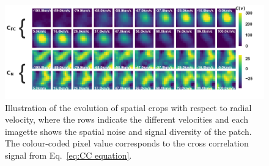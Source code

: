 \documentclass{aa}
\begin{document}
\begin{figure}[t]
    \includegraphics[width=\textwidth]{fig_2_dec2023_aligned_cropped.png}
    \caption{%
    Illustration of the evolution of spatial crops with respect to radial velocity, where the rows indicate the different velocities and each imagette shows the spatial noise and signal diversity of the patch. 
    The colour-coded pixel value corresponds to the cross correlation signal from Eq.~\ref{eq:CC equation}. 
    }
    \label{fig:fig-2}
\end{figure}
\end{document}
